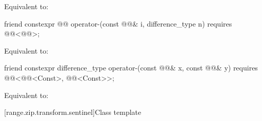 \begin{itemdescr}
\pnum
\effects
Equivalent to:
\end{itemdescr}

\begin{itemdecl}
friend constexpr @@ operator-(const @@& i, difference_type n)
  requires @@<@@>;
\end{itemdecl}

\begin{itemdescr}
\pnum
\effects
Equivalent to:
\end{itemdescr}

\begin{itemdecl}
friend constexpr difference_type operator-(const @@& x, const @@& y)
  requires @@<@@<Const>, @@<Const>>;
\end{itemdecl}

\begin{itemdescr}
\pnum
\effects
Equivalent to:
\end{itemdescr}

[range.zip.transform.sentinel]{Class template }

